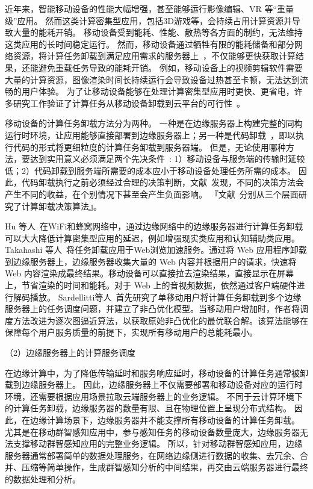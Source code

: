 近年来，智能移动设备的性能大幅增强，甚至能够运行影像编辑、VR 等“重量级”应用。
然而这类计算密集型应用，包括3D游戏等，会持续占用计算资源并导致大量的能耗开销。
移动设备受到能耗、性能、散热等各方面的制约，无法维持这类应用的长时间稳定运行。
然而，移动设备通过牺牲有限的能耗储备和部分网络资源，将计算任务卸载到满足应用需求的服务器上~\cite{DBLP:conf/ispa/KovachevYK12}，不仅能够更快获取计算结果，还能避免重载任务导致的能耗开销。
例如，移动设备上的视频剪辑软件需要大量的计算资源，图像渲染时间长持续运行会导致设备过热甚至卡顿，无法达到流畅的用户体验。
为了让移动设备能够在处理计算密集型应用时更快、更省电，许多研究工作验证了计算任务从移动设备卸载到云平台的可行性~\cite{DBLP:conf/secon/HassanXWC15,DBLP:journals/pervasive/SatyanarayananBCD09,DBLP:journals/computer/KumarL10}。

移动设备的计算任务卸载方法分为两种。
一种是在边缘服务器上构建完整的同构运行时环境，让应用能够直接部署到边缘服务器上；另一种是代码卸载~\cite{DBLP:conf/mobisys/CuervoBCWSCB10}，即以执行代码的形式将更细粒度的计算任务卸载到服务器端。
但是，无论使用哪种方法，要达到实用意义必须满足两个先决条件~\cite{Flores:2017bv}: 1）移动设备与服务端的传输时延较低；2）代码卸载到服务端所需要的成本应小于移动设备处理任务所需的成本。
因此，代码卸载执行之前必须经过合理的决策判断，文献~\cite{Kosta:2012cj}发现，不同的决策方法会产生不同的收益，在个别情况下甚至会产生负面影响。
『文献~\cite{Chen:2016bd,Baier:2012hb,Han:2012dl}分别从三个层面研究了计算卸载决策算法』。

Hu 等人~\cite{DBLP:conf/apsys/HuGHWACPS16}在WiFi和蜂窝网络中，通过边缘网络中的边缘服务器进行计算任务卸载可以大大降低计算密集型应用的延迟，例如增强现实类应用和认知辅助类应用。
Takahashi 等人~\cite{DBLP:conf/mobilecloud/TakahashiTK15}将任务卸载应用于Web浏览加速服务。通过将 Web 应用程序卸载到边缘服务器上，边缘服务器收集大量的 Web 内容并根据用户的请求，快速将 Web 内容渲染成最终结果。移动设备可以直接拉去渲染结果，直接显示在屏幕上，节省渲染的时间和能耗。对于 Web 上的音视频数据，依然通过客户端硬件进行解码播放。
Sardellitti等人~\cite{DBLP:journals/tsipn/SardellittiSB15}首先研究了单移动用户将计算任务卸载到多个边缘服务器上的任务调度问题，并建立了非凸优化模型。当移动用户增加时，作者将调度方法改进为逐次图逼近算法，以获取原始非凸优化的最优联合解。该算法能够在保障每个用户服务质量的前提下，实现所有移动用户的总能耗最小。

（2）边缘服务器上的计算服务调度

在边缘计算中，为了降低传输延时和服务响应延时，移动设备的计算任务通常被卸载到边缘服务器上。
因此，边缘服务器上不仅需要部署和移动设备对应的运行时环境，还需要根据应用场景拉取云端服务器上的业务逻辑。
不同于云计算环境下的计算任务卸载，边缘服务器的数量有限、且在物理位置上呈现分布式结构。
因此，在边缘计算场景下，边缘服务器并不能支撑所有移动设备的计算任务卸载。
尤其是在移动群智感知应用中，参与感知任务的移动设备数量庞大，边缘服务器无法支撑移动群智感知应用的完整业务逻辑。
所以，针对移动群智感知应用，边缘服务器通常部署简单的数据处理服务，在网络边缘侧进行数据的收集、去冗余、合并、压缩等简单操作，生成群智感知分析的中间结果，再交由云端服务器进行最终的数据处理和分析。

